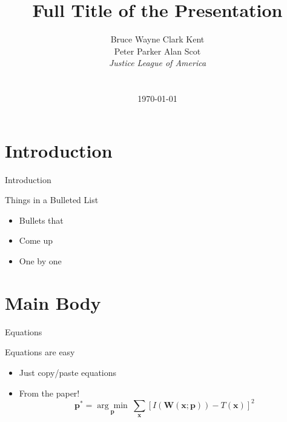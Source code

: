 \documentclass[xcolor=x11names,handout]{beamer}
\title
  [Short Title\hspace{2em}]
  {Full Title of the Presentation}
\date{}
\begin{document}
\begin{frame}
  \author
  [Bruce Wayne]
  {Bruce Wayne \quad Clark Kent\\Peter Parker \quad Alan Scot\\[2ex]
    {\it Justice League of America}\\[3ex]
    \\[2ex]
    \today}
  \titlepage
\end{frame}

\section
  {Introduction}

\begin{frame}
  {Introduction}

  Things in a Bulleted List\pause

  \begin{itemize}
  \item Bullets that\pause
  \item Come up\pause
  \item One by one
  \end{itemize}
\end{frame}



\section
  {Main Body}

\begin{frame}
  {Equations}

  Equations are easy
  \begin{itemize}
  \item Just copy/paste equations\pause
  \item From the paper!
    \begin{equation*}
      \textbf{p}^* = \underset{\textbf{p}}{\arg\!\min}~\sum_{\textbf{x}}\left[ I(\textbf{W}(\textbf{x};\textbf{p})) - T(\textbf{x}) \right]^2
    \end{equation*}
  \end{itemize}
\end{frame}
\end{document}
